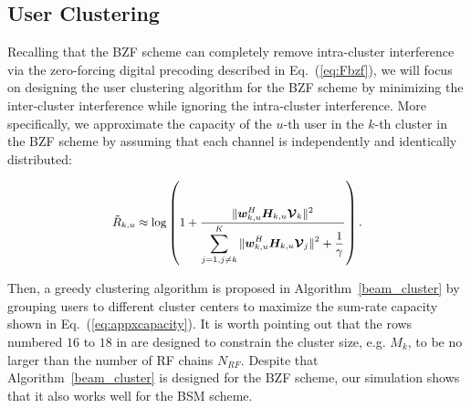 \documentclass[conference]{IEEEtran}
\def\argmax{\mathop{\mbox{arg\,max}}}
\begin{document}
{\subsection{User Clustering}
Recalling that the BZF scheme can completely remove intra-cluster interference via the zero-forcing digital precoding described in Eq.~(\ref{eq:Fbzf}), we will focus on designing the user clustering algorithm for the BZF scheme by minimizing the inter-cluster interference while ignoring the intra-cluster interference. More specifically, we approximate the capacity of the $u$-th user in the $k$-th cluster in the BZF scheme by assuming that each channel is independently and identically distributed:

\begin{align}\label{eq:appxcapacity}\small
\tilde{R}_{k,u} \approx \log\left(1+\frac{\|\bm{w}^H_{k,u} \bm{H}_{k,u} \bm{\mathcal{V}}_{k}\|^2}{\displaystyle\sum_{j=1,j\neq k}^{K}\|{\bm{w}}^H_{k,u} \bm{H}_{k,u} {\bm{\mathcal{V}}}_j\|^2+{1\over \gamma}}\right).
\end{align}

Then, a greedy clustering algorithm is proposed in Algorithm~\ref{beam_cluster} by grouping users to different cluster centers to maximize the sum-rate capacity shown in Eq.~(\ref{eq:appxcapacity}). It is worth pointing out that the rows numbered $16$ to $18$ in are designed to constrain the cluster size, e.g. $M_k$, to be no larger than the number of RF chains $N_{RF}$. Despite that Algorithm~\ref{beam_cluster} is designed for the BZF scheme, our simulation shows that it also works well for the BSM scheme.



%

}
\end{document}
